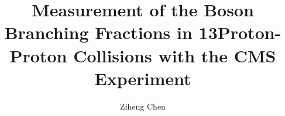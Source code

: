 \documentclass[12pt,reqno]{nuthesis}
\author{Ziheng Chen}
\title{Measurement of the \PW Boson Branching Fractions in 13\TeV Proton-Proton Collisions with the CMS Experiment}
\begin{document}
    
    
    


    \mainmatter  
    
    
    
    
    
    
    
    
    


    \begin{singlespace}
    
    
    \end{singlespace}
    
    
\end{document}
